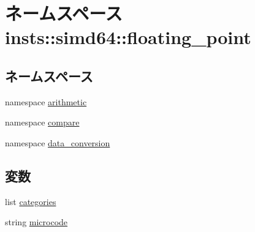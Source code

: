 \hypertarget{namespaceinsts_1_1simd64_1_1floating__point}{
\section{ネームスペース insts::simd64::floating\_\-point}
\label{namespaceinsts_1_1simd64_1_1floating__point}
}
\subsection*{ネームスペース}
\begin{DoxyCompactItemize}
\item 
namespace \hyperlink{namespaceinsts_1_1simd64_1_1floating__point_1_1arithmetic}{arithmetic}
\item 
namespace \hyperlink{namespaceinsts_1_1simd64_1_1floating__point_1_1compare}{compare}
\item 
namespace \hyperlink{namespaceinsts_1_1simd64_1_1floating__point_1_1data__conversion}{data\_\-conversion}
\end{DoxyCompactItemize}
\subsection*{変数}
\begin{DoxyCompactItemize}
\item 
list \hyperlink{namespaceinsts_1_1simd64_1_1floating__point_a273cf0f1630af14c1582f05e53354a55}{categories}
\item 
string \hyperlink{namespaceinsts_1_1simd64_1_1floating__point_a770f11a173e99389a8802f0107ed8f52}{microcode}
\end{DoxyCompactItemize}


